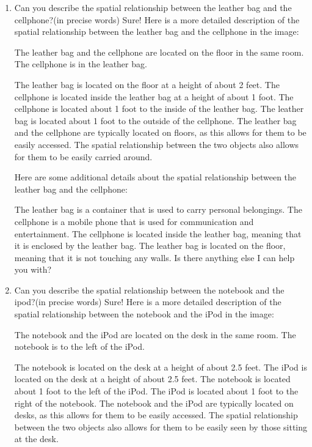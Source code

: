 \begin{enumerate}
    \item Can you describe the spatial relationship between the leather bag and the cellphone?(in precise words)
    \subitem 
    Sure! Here is a more detailed description of the spatial relationship between the leather bag and the cellphone in the image:
    
    The leather bag and the cellphone are located on the floor in the same room. The cellphone is in the leather bag.
    
    The leather bag is located on the floor at a height of about 2 feet.
    The cellphone is located inside the leather bag at a height of about 1 foot.
    The cellphone is located about 1 foot to the inside of the leather bag.
    The leather bag is located about 1 foot to the outside of the cellphone.
    The leather bag and the cellphone are typically located on floors, as this allows for them to be easily accessed. The spatial relationship between the two objects also allows for them to be easily carried around.
    
    Here are some additional details about the spatial relationship between the leather bag and the cellphone:
    
    The leather bag is a container that is used to carry personal belongings.
    The cellphone is a mobile phone that is used for communication and entertainment.
    The cellphone is located inside the leather bag, meaning that it is enclosed by the leather bag.
    The leather bag is located on the floor, meaning that it is not touching any walls.
    Is there anything else I can help you with?
    \item Can you describe the spatial relationship between the notebook and the ipod?(in precise words)
    \subitem 
    Sure! Here is a more detailed description of the spatial relationship between the notebook and the iPod in the image:
    
    The notebook and the iPod are located on the desk in the same room. The notebook is to the left of the iPod.
    
    The notebook is located on the desk at a height of about 2.5 feet.
    The iPod is located on the desk at a height of about 2.5 feet.
    The notebook is located about 1 foot to the left of the iPod.
    The iPod is located about 1 foot to the right of the notebook.
    The notebook and the iPod are typically located on desks, as this allows for them to be easily accessed. The spatial relationship between the two objects also allows for them to be easily seen by those sitting at the desk.
    

\end{enumerate}
